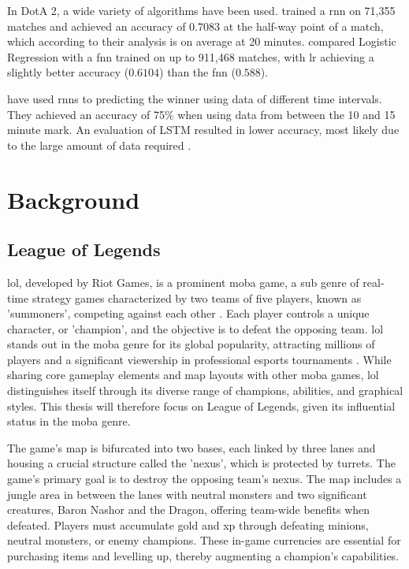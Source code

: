 \documentclass[12pt, a4paper, headinclude, twoside, plainheadsepline, open=right, numbers=noenddot, hidelinks, toc=listof, toc=bibliography]{scrreprt}
\begin{document}
In DotA 2, a wide variety of algorithms have been used.  
 \cite{yuMOBASliceTimeSlice2018} trained a \ac{rnn} on 71,355 matches and achieved an accuracy of $0.7083$ at the half-way point of a match, which according to their analysis is on average at 20 minutes.
 \cite{wangPredictingMultiplayerOnline2016} compared Logistic Regression with a \ac{fnn} trained on up to 911,468 matches, with \ac{lr} achieving a slightly better accuracy ($0.6104$) than the \ac{fnn} ($0.588$).


 have used \acp{rnn} to predicting the winner using data of different time intervals. They achieved an accuracy of 75\% when using data from between the 10 and 15 minute mark.
An evaluation of LSTM resulted in lower accuracy, most likely due to the large amount of data required \cite{silvaContinuousOutcomePrediction2018}.

\chapter{Background}
\label{chap:background}

\section{League of Legends}
\label{sec:LoL}

\ac{lol}, developed by Riot Games, is a prominent \ac{moba} game, a sub genre of real-time strategy games characterized by two teams of five players, known as 'summoners', competing against each other \cite{mora-cantallopsMOBAGamesLiterature2018}. 
Each player controls a unique character, or 'champion', and the objective is to defeat the opposing team. 
\Ac{lol} stands out in the \ac{moba} genre for its global popularity, attracting millions of players and a significant viewership in professional esports tournaments \cite{goughLeagueLegendsChampionships}.
While sharing core gameplay elements and map layouts with other \ac{moba} games, \ac{lol} distinguishes itself through its diverse range of champions, abilities, and graphical styles. 
This thesis will therefore focus on League of Legends, given its influential status in the \ac{moba} genre. 

The game's map is bifurcated into two bases, each linked by three lanes and housing a crucial structure called the 'nexus', which is protected by turrets. 
The game's primary goal is to destroy the opposing team's nexus.
The map includes a jungle area in between the lanes with neutral monsters and two significant creatures, Baron Nashor and the Dragon, offering team-wide benefits when defeated.
Players must accumulate gold and \ac{xp} through defeating minions, neutral monsters, or enemy champions. 
These in-game currencies are essential for purchasing items and levelling up, thereby augmenting a champion's capabilities.
\end{document}
